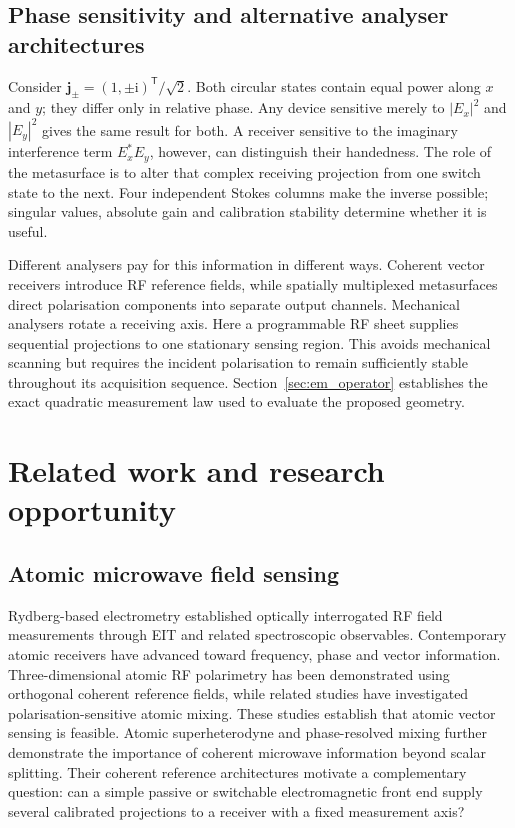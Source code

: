 \documentclass{ieeeaccess}
\begin{document}
\subsection{Phase sensitivity and alternative analyser architectures}
Consider $\boldsymbol j_{\pm}=(1,\pm\mathrm i)^{\mathsf T}/\sqrt2$. Both circular states contain equal power along $x$ and $y$; they differ only in relative phase. Any device sensitive merely to $|E_x|^2$ and $|E_y|^2$ gives the same result for both. A receiver sensitive to the imaginary interference term $E_x^*E_y$, however, can distinguish their handedness. The role of the metasurface is to alter that complex receiving projection from one switch state to the next. Four independent Stokes columns make the inverse possible; singular values, absolute gain and calibration stability determine whether it is useful.

Different analysers pay for this information in different ways. Coherent vector receivers introduce RF reference fields, while spatially multiplexed metasurfaces direct polarisation components into separate output channels. Mechanical analysers rotate a receiving axis. Here a programmable RF sheet supplies sequential projections to one stationary sensing region. This avoids mechanical scanning but requires the incident polarisation to remain sufficiently stable throughout its acquisition sequence. Section~\ref{sec:em_operator} establishes the exact quadratic measurement law used to evaluate the proposed geometry.

\section{Related work and research opportunity}
\subsection{Atomic microwave field sensing}
Rydberg-based electrometry established optically interrogated RF field measurements through EIT and related spectroscopic observables\cite{Mohapatra2007,Gallagher1994,Sedlacek2012,Sedlacek2013,Holloway2014,Zhang2024,Schlossberger2024}. Contemporary atomic receivers have advanced toward frequency, phase and vector information. Three-dimensional atomic RF polarimetry has been demonstrated using orthogonal coherent reference fields\cite{Elgee2024,Cloutman2024}, while related studies have investigated polarisation-sensitive atomic mixing\cite{Yin2024}. These studies establish that atomic vector sensing is feasible. Atomic superheterodyne and phase-resolved mixing further demonstrate the importance of coherent microwave information beyond scalar splitting\cite{Jing2020,Holloway2019Mixer}. Their coherent reference architectures motivate a complementary question: can a simple passive or switchable electromagnetic front end supply several calibrated projections to a receiver with a fixed measurement axis?
\end{document}
